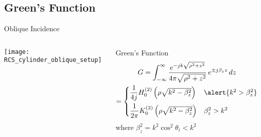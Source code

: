 %
%

\subsection{Green's Function}

  \begin{frame}[allowframebreaks]{Oblique Incidence}

  \begin{columns}
     \centering
    \texttt{[image: RCS\_cylinder\_oblique\_setup]}
    
     \centering
   \begin{block}{Green's Function}
       \begin{multline*}
         G = \int_{-\infty}^{\infty} 
        \dfrac{e^{-j k \sqrt{\rho^2+z^2}}}{4\pi \sqrt{\rho^2+z^2}}
        \, e^{\pm j\beta_z z } \, dz \\
        = 
        \begin{cases}
          \dfrac{1}{4j} H_0^{(2)}\left( \rho\sqrt{k^2-\beta_z^2}\right) 
                  & \alert{k^2 > \beta_z^2} \\[2ex]
          \dfrac{1}{2\pi} K_0^{(2)}\left( \rho\sqrt{k^2-\beta_z^2}\right) 
                  & \beta_z^2 > k^2
        \end{cases}
      \end{multline*}
      where $\beta_z^2=k^2\cos^2\theta_i < k^2$


    \end{block}


\end{columns}
\end{frame}
